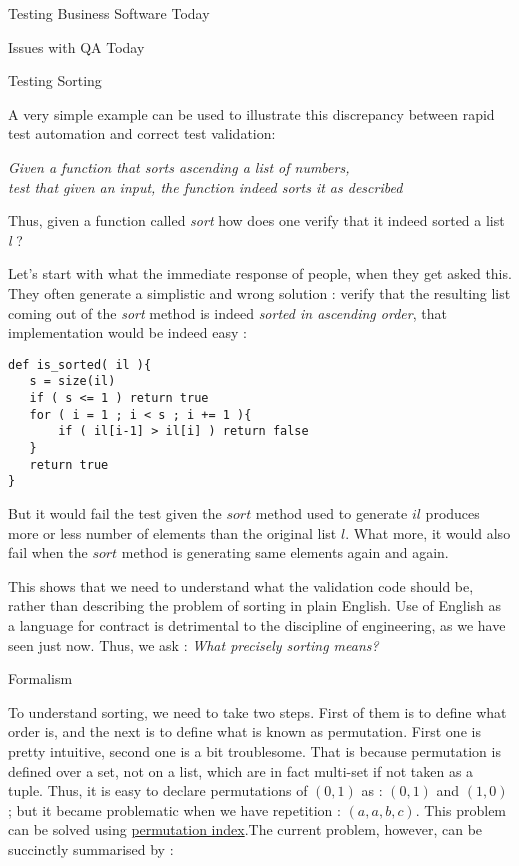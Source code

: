 \begin{section}{Testing Business Software Today}
\begin{subsection}{Issues with QA Today}
\end{subsection}

\begin{subsection}{Testing Sorting}

A very simple example can be used to illustrate this discrepancy between rapid test automation and correct test validation:

\begin{center}
\emph{Given a function that sorts ascending a list of numbers,\\ test that given an input, the function indeed sorts it as described}
\end{center}


Thus, given a function called \emph{sort} how does one verify that it indeed sorted a list \emph{l} ?  

Let's start with what the immediate response of people, when they get asked this. They often generate  a  simplistic and wrong solution :  verify that the resulting list coming out of the \emph{sort} method is indeed \emph{sorted in ascending order}, that implementation would be indeed easy :

\begin{lstlisting}[style=JexlStyle]
def is_sorted( il ){
   s = size(il) 
   if ( s <= 1 ) return true 
   for ( i = 1 ; i < s ; i += 1 ){
       if ( il[i-1] > il[i] ) return false 
   }
   return true 
}
\end{lstlisting}


But it would fail the test given the $sort$ method used to generate $il$ produces more or less number of elements 
than the original list $l$. What more, it would also fail when the $sort$ method is generating same elements again and again.

This shows that we need to understand what the validation code should be, rather than describing the problem of sorting in plain English. Use of English as a language for contract is detrimental to the discipline of engineering, as we have seen just now. Thus, we ask : 
\emph{ What precisely sorting means? }

\end{subsection}

\begin{subsection}{Formalism}

To understand sorting, we need to take two steps. First of them is to define what order is, and the next is to define what is known as permutation. First one is pretty intuitive, second one is a bit troublesome. That is because permutation is defined over a set, not on a list, which are in fact multi-set if not taken as a tuple. Thus, it is easy to declare permutations of  $(0, 1)$ as : $(0,1)$ and $(1,0)$ ; but it became problematic when we have repetition : $(a,a,b,c)$.  This problem can be solved using 
\href{http://mathworld.wolfram.com/PermutationIndex.html}{permutation index}.The current problem, however,  can be succinctly summarised by :


\end{subsection}
\end{section}
